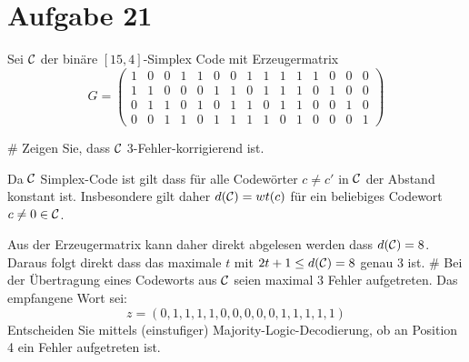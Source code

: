 \section*{Aufgabe 21}
Sei $\mathcal{C}$ der binäre $[15,4]$-Simplex Code mit Erzeugermatrix
\begin{equation*}
	G = 
	\begin{pmatrix}
	1 & 0 & 0 & 1 & 1 & 0 & 0 & 1 & 1 & 1 & 1 & 1 & 0 & 0 & 0 \\
	1 & 1 & 0 & 0 & 0 & 1 & 1 & 0 & 1 & 1 & 1 & 0 & 1 & 0 & 0 \\
	0 & 1 & 1 & 0 & 1 & 0 & 1 & 1 & 0 & 1 & 1 & 0 & 0 & 1 & 0 \\
	0 & 0 & 1 & 1 & 0 & 1 & 1 & 1 & 1 & 0 & 1 & 0 & 0 & 0 & 1
	\end{pmatrix}
\end{equation*}
\begin{myList}
#
Zeigen Sie, dass $\mathcal{C}$ 3-Fehler-korrigierend ist.

Da $\mathcal{C}$ Simplex-Code ist gilt dass für alle Codewörter $c\neq c'$ in $\mathcal{C}$ der Abstand konstant ist. Insbesondere gilt daher $d(\mathcal{C}) = wt(c)$ für ein beliebiges Codewort $c \neq 0 \in \mathcal{C}$.\medskip

Aus der Erzeugermatrix kann daher direkt abgelesen werden dass $d(\mathcal{C}) = 8$.
Daraus folgt direkt dass das maximale $t$ mit $2t+1 \leq d(\mathcal{C}) = 8$ genau 3 ist.
#
Bei der Übertragung eines Codeworts aus $\mathcal{C}$ seien maximal 3 Fehler aufgetreten. Das empfangene Wort sei:
\begin{equation*}
	z = (0,1,1,1,1,0,0,0,0,0,1,1,1,1,1)
\end{equation*}
Entscheiden Sie mittels (einstufiger) Majority-Logic-Decodierung, ob an Position 4 ein Fehler aufgetreten ist.
\end{myList}


